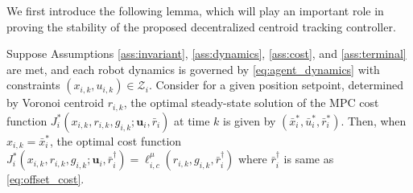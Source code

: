 We first introduce the following lemma, which will play an important role in proving the stability of the proposed decentralized centroid tracking controller. 
\begin{lemma}
\label{lem:stab_eq}
Suppose Assumptions \ref{ass:invariant}, \ref{ass:dynamics}, \ref{ass:cost}, and \ref{ass:terminal} are met, and each robot dynamics is governed by \eqref{eq:agent_dynamics} with constraints $(x_{i,k},u_{i,k})\in \mathcal{Z}_i$. Consider for a given position setpoint, determined by Voronoi centroid $r_{i,k}$, the optimal steady-state solution of the MPC cost function $J_i^*(x_{i,k}, r_{i,k}, g_{i,k}; \mathbf{u}_i, \bar{r}_i)$ at time $k$ is given by $(\bar{x}_i^*, \bar{u}_i^*, \bar{r}_i^*)$. Then, when $x_{i,k} = \bar{x}_i^*$, the optimal cost function
$J_i^*(x_{i,k}, r_{i,k}, g_{i,k}; \mathbf{u}_i, \bar{r}^{\dagger}_i) = \ell_{i,c}^\mu(r_{i,k},g_{i,k},\bar{r}^\dagger_i)$
where $\bar{r}_i^{\dagger}$ is same as \eqref{eq:offset_cost}.
\end{lemma}
